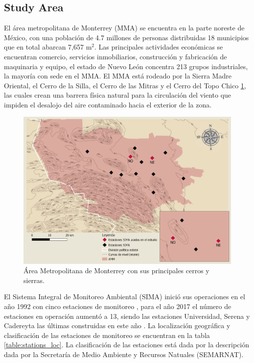\subsection{Study Area}
El área metropolitana de Monterrey (MMA) se encuentra en la parte noreste de México, con una población de 4.7 millones de personas distribuidas 18 municipios que en total abarcan 7,657 m$^2$\cite{inegi2015}. Las principales actividades económicas se encuentran comercio, servicios inmobiliarios, construcción y fabricación de maquinaria y equipo, el estado de Nuevo León concentra 213 grupos industriales, la mayoría con sede en el MMA. El MMA está rodeado por la Sierra Madre Oriental, el Cerro de la Silla, el Cerro de las Mitras y el Cerro del Topo Chico \ref{fig:map}, las cuales crean una barrera física natural para la circulación del viento que impiden el desalojo del aire contaminado hacia el exterior de la zona.\cite{proaire2008}
\begin{figure}[H]
    \centering
    \includegraphics[scale=0.2]{images/map.png}
    \caption{Área Metropolitana de Monterrey con sus principales cerros y sierras.}
    \label{fig:map}
\end{figure}
El Sistema Integral de Monitoreo Ambiental (SIMA) inició sus operaciones en el año 1992 con cinco estaciones de monitoreo , para el año 2017 el número de estaciones en operación aumentó a 13, siendo las estaciones Universidad, Serena y Cadereyta las últimas construidas en este año \cite{simapage}. La localización geográfica y clasificación de las estaciones de monitoreo se encuentran en la tabla \ref{table:stations_loc}. La clasificación de las estaciones está dada por la descripción dada por la Secretaría de Medio Ambiente y Recursos Natuales (SEMARNAT). \cite{proaire2016}


